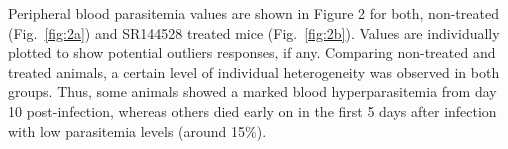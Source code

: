 \documentclass[empirical, authordate, issue]{jote-new-article}
\begin{document}
Peripheral blood parasitemia values are shown in Figure 2 for both, non-treated (Fig.~\ref{fig:2a}) and SR144528 treated mice (Fig.~\ref{fig:2b}). Values are individually plotted to show potential outliers responses, if any. Comparing non-treated and treated animals, a certain level of individual heterogeneity was observed in both groups. Thus, some animals showed a marked blood hyperparasitemia from day 10 post-infection, whereas others died early on in the first 5 days after infection with low parasitemia levels (around 15\%).

\begin{figure}[h!]
  \begin{fullwidth}
    \raggedright
    \caption{}
    \label{fig:3}
  \end{fullwidth}
\end{figure}
\end{document}
